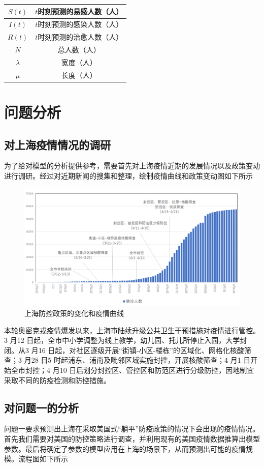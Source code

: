 \documentclass[bwprint]{gmcmthesis}
\numberwithin{figure}{section}
\begin{document}
\begin{tabular}{cc}
       $S\left( t \right) $    & $t$时刻预测的易感人数（人）  \\ \hline
       $I\left( t \right) $ 	& $t$时刻预测的感染人数（人）  \\ \hline
       $R\left( t \right) $ 	& $t$时刻预测的治愈人数（人）  \\ \hline
       $N$	                        & 总人数（人）  \\ \hline
       $\lambda$ 	                & 宽度（人） \\ \hline
       $\mu$	                    & 长度（人）  \\ \hline
   \end{tabular}

\section{问题分析}
\subsection{对上海疫情情况的调研}
为了给对模型的分析提供参考，需要首先对上海疫情近期的发展情况以及政策变动进行调研。经过对近期新闻的搜集和整理，绘制疫情曲线和政策变动图如下所示
\begin{figure}[!h]
\centering
\includegraphics[width=.9\textwidth]{shanghai_bianhua.png}
\caption{上海防控政策的变化和疫情曲线}
\label{fig3}
\end{figure}
\par 本轮奥密克戎疫情爆发以来，上海市陆续升级公共卫生干预措施对疫情进行管控。3 月12 日起，全市中小学调整为线上教学，幼儿园、托儿所停止入园，大学封闭。从3 月16 日起，对社区逐级开展“街镇-小区-楼栋”的区域化、网格化核酸筛查；3 月28 日5 时起浦东、浦南及毗邻区域实施封控，开展核酸筛查；4 月1 日开始全市封控；4 月10 日后划分封控区、管控区和防范区进行分级防控，因地制宜采取不同的防疫检测和防控措施。
\subsection{对问题一的分析}
问题一要求预测出上海在采取美国式“躺平”防疫政策的情况下会出现的疫情情况。首先我们需要对美国的防控策略进行调查，并利用现有的美国疫情数据推算出模型参数。最后将确定了参数的模型应用在上海的场景下，从而预测出可能的疫情规模。流程图如下所示
\end{document}
